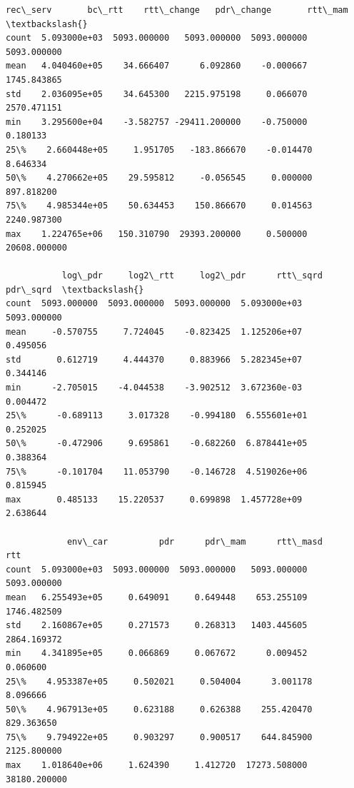\documentclass[11pt]{article}
\makeatletter
\newcommand{\boxspacing}{\kern\kvtcb@left@rule\kern\kvtcb@boxsep}
\newcommand{\prompt}[4]{
        {\ttfamily\llap{{\color{#2}[#3]:\hspace{3pt}#4}}\vspace{-\baselineskip}}
    }
\makeatother
\begin{document}
            \begin{tcolorbox}[breakable, size=fbox, boxrule=.5pt, pad at break*=1mm, opacityfill=0]
\prompt{Out}{outcolor}{26}{\boxspacing}
\begin{Verbatim}[commandchars=\\\{\}]
           rec\_serv       bc\_rtt    rtt\_change   pdr\_change       rtt\_mam  \textbackslash{}
count  5.093000e+03  5093.000000   5093.000000  5093.000000   5093.000000
mean   4.040460e+05    34.666407      6.092860    -0.000667   1745.843865
std    2.036095e+05    34.645300   2215.975198     0.066070   2570.471151
min    3.295600e+04    -3.582757 -29411.200000    -0.750000      0.180133
25\%    2.660448e+05     1.951705   -183.866670    -0.014470      8.646334
50\%    4.270662e+05    29.595812     -0.056545     0.000000    897.818200
75\%    4.985344e+05    50.634453    150.866670     0.014563   2240.987300
max    1.224765e+06   150.310790  29393.200000     0.500000  20608.000000

           log\_pdr     log2\_rtt     log2\_pdr      rtt\_sqrd     pdr\_sqrd  \textbackslash{}
count  5093.000000  5093.000000  5093.000000  5.093000e+03  5093.000000
mean     -0.570755     7.724045    -0.823425  1.125206e+07     0.495056
std       0.612719     4.444370     0.883966  5.282345e+07     0.344146
min      -2.705015    -4.044538    -3.902512  3.672360e-03     0.004472
25\%      -0.689113     3.017328    -0.994180  6.555601e+01     0.252025
50\%      -0.472906     9.695861    -0.682260  6.878441e+05     0.388364
75\%      -0.101704    11.053790    -0.146728  4.519026e+06     0.815945
max       0.485133    15.220537     0.699898  1.457728e+09     2.638644

            env\_car          pdr      pdr\_mam      rtt\_masd           rtt
count  5.093000e+03  5093.000000  5093.000000   5093.000000   5093.000000
mean   6.255493e+05     0.649091     0.649448    653.255109   1746.482509
std    2.160867e+05     0.271573     0.268313   1403.445605   2864.169372
min    4.341895e+05     0.066869     0.067672      0.009452      0.060600
25\%    4.953387e+05     0.502021     0.504004      3.001178      8.096666
50\%    4.967913e+05     0.623188     0.626388    255.420470    829.363650
75\%    9.794922e+05     0.903297     0.900517    644.845900   2125.800000
max    1.018640e+06     1.624390     1.412720  17273.508000  38180.200000
\end{Verbatim}
\end{tcolorbox}
        
\end{document}
